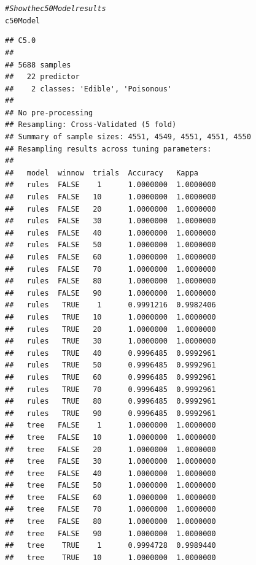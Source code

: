 \documentclass[10pt  ,usenames, dvipsnames]{article}\usepackage[]{graphicx}\usepackage[]{color}
\makeatletter
\newcommand{\hlcom}[1]{\textcolor[rgb]{0.678,0.584,0.686}{\textit{#1}}}%
\newcommand{\hlstd}[1]{\textcolor[rgb]{0.345,0.345,0.345}{#1}}%
\newenvironment{kframe}{%
 \def\at@end@of@kframe{}%
 \ifinner\ifhmode%
  \def\at@end@of@kframe{\end{minipage}}%
  \begin{minipage}{\columnwidth}%
 \fi\fi%
 \def\FrameCommand##1{\hskip\@totalleftmargin \hskip-\fboxsep
 \colorbox{shadecolor}{##1}\hskip-\fboxsep
     \hskip-\linewidth \hskip-\@totalleftmargin \hskip\columnwidth}%
 \MakeFramed {\advance\hsize-\width
   \@totalleftmargin\z@ \linewidth\hsize
   \@setminipage}}%
 {\par\unskip\endMakeFramed%
 \at@end@of@kframe}
\newenvironment{knitrout}{}{} %
\makeatother
\begin{document}
\begin{knitrout}
\color{fgcolor}\begin{kframe}
\begin{alltt}
\hlcom{#Show the c50Model results}
 \hlstd{c50Model}
\end{alltt}
\end{kframe}
\end{knitrout}




\begin{knitrout}
\color{fgcolor}\begin{kframe}
\begin{verbatim}
## C5.0 
## 
## 5688 samples
##   22 predictor
##    2 classes: 'Edible', 'Poisonous' 
## 
## No pre-processing
## Resampling: Cross-Validated (5 fold) 
## Summary of sample sizes: 4551, 4549, 4551, 4551, 4550 
## Resampling results across tuning parameters:
## 
##   model  winnow  trials  Accuracy   Kappa    
##   rules  FALSE    1      1.0000000  1.0000000
##   rules  FALSE   10      1.0000000  1.0000000
##   rules  FALSE   20      1.0000000  1.0000000
##   rules  FALSE   30      1.0000000  1.0000000
##   rules  FALSE   40      1.0000000  1.0000000
##   rules  FALSE   50      1.0000000  1.0000000
##   rules  FALSE   60      1.0000000  1.0000000
##   rules  FALSE   70      1.0000000  1.0000000
##   rules  FALSE   80      1.0000000  1.0000000
##   rules  FALSE   90      1.0000000  1.0000000
##   rules   TRUE    1      0.9991216  0.9982406
##   rules   TRUE   10      1.0000000  1.0000000
##   rules   TRUE   20      1.0000000  1.0000000
##   rules   TRUE   30      1.0000000  1.0000000
##   rules   TRUE   40      0.9996485  0.9992961
##   rules   TRUE   50      0.9996485  0.9992961
##   rules   TRUE   60      0.9996485  0.9992961
##   rules   TRUE   70      0.9996485  0.9992961
##   rules   TRUE   80      0.9996485  0.9992961
##   rules   TRUE   90      0.9996485  0.9992961
##   tree   FALSE    1      1.0000000  1.0000000
##   tree   FALSE   10      1.0000000  1.0000000
##   tree   FALSE   20      1.0000000  1.0000000
##   tree   FALSE   30      1.0000000  1.0000000
##   tree   FALSE   40      1.0000000  1.0000000
##   tree   FALSE   50      1.0000000  1.0000000
##   tree   FALSE   60      1.0000000  1.0000000
##   tree   FALSE   70      1.0000000  1.0000000
##   tree   FALSE   80      1.0000000  1.0000000
##   tree   FALSE   90      1.0000000  1.0000000
##   tree    TRUE    1      0.9994728  0.9989440
##   tree    TRUE   10      1.0000000  1.0000000

\end{verbatim}
\end{kframe}
\end{knitrout}
\end{document}
